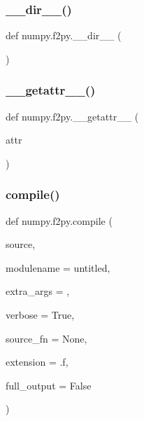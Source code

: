 \subsubsection{\texorpdfstring{\+\_\+\+\_\+dir\+\_\+\+\_\+()}{\_\_dir\_\_()}}
{\footnotesize\ttfamily def numpy.\+f2py.\+\_\+\+\_\+dir\+\_\+\+\_\+ (\begin{DoxyParamCaption}{ }\end{DoxyParamCaption})}

\mbox{\label{namespacenumpy_1_1f2py_a62e42f028958f5e5b33efa5da3a0d233}} 
\subsubsection{\texorpdfstring{\+\_\+\+\_\+getattr\+\_\+\+\_\+()}{\_\_getattr\_\_()}}
{\footnotesize\ttfamily def numpy.\+f2py.\+\_\+\+\_\+getattr\+\_\+\+\_\+ (\begin{DoxyParamCaption}\item[{}]{attr }\end{DoxyParamCaption})}

\mbox{\label{namespacenumpy_1_1f2py_a7147a103fc7e183b7293a8d1875ac811}} 
\subsubsection{\texorpdfstring{compile()}{compile()}}
{\footnotesize\ttfamily def numpy.\+f2py.\+compile (\begin{DoxyParamCaption}\item[{}]{source,  }\item[{}]{modulename = {\ttfamily \textquotesingle{}untitled\textquotesingle{}},  }\item[{}]{extra\+\_\+args = {\ttfamily \textquotesingle{}\textquotesingle{}},  }\item[{}]{verbose = {\ttfamily True},  }\item[{}]{source\+\_\+fn = {\ttfamily None},  }\item[{}]{extension = {\ttfamily \textquotesingle{}.f\textquotesingle{}},  }\item[{}]{full\+\_\+output = {\ttfamily False} }\end{DoxyParamCaption})}

